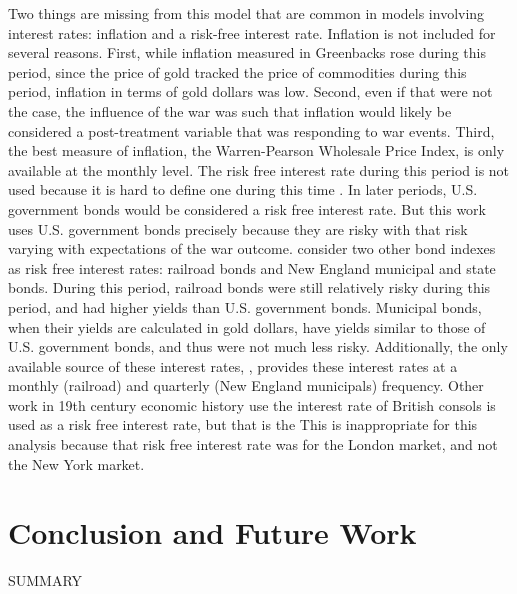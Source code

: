 Two things are missing from this model that are common in models involving interest rates: inflation and a risk-free interest rate.
Inflation is not included for several reasons.
First, while inflation measured in Greenbacks rose during this period, since the price of gold tracked the price of commodities during this period, inflation in terms of gold dollars was low\parencites{Mitchell1903}{Mitchell1908}.
Second, even if that were not the case, the influence of the war was such that inflation would likely be considered a post-treatment variable that was responding to war events.
Third, the best measure of inflation, the Warren-Pearson Wholesale Price Index, is only available at the monthly level.
The risk free interest rate during this period is not used because it is hard to define one during this time \parencites{HomerSylla2005}.
In later periods, U.S. government bonds would be considered a risk free interest rate.
But this work uses U.S. government bonds precisely because they are risky with that risk varying with expectations of the war outcome.
\textcites{Macaulay1938}{HomerSylla2005} consider two other bond indexes as risk free interest rates: railroad bonds and New England municipal and state bonds.
During this period, railroad bonds were still relatively risky during this period, and had higher yields than U.S. government bonds.
Municipal bonds, when their yields are calculated in gold dollars, have yields similar to those of U.S. government bonds, and thus were not much less risky.
Additionally, the only available source of these interest rates, \textcite{Macaulay1938}, provides these interest rates at a monthly (railroad) and quarterly (New England municipals) frequency.
Other work in 19th century economic history use the interest rate of British consols is used as a risk free interest rate, but that is the
This is inappropriate for this analysis because that risk free interest rate was for the London market, and not the New York market.



\section{Conclusion and Future Work}
\label{sec:conclusion}

SUMMARY

